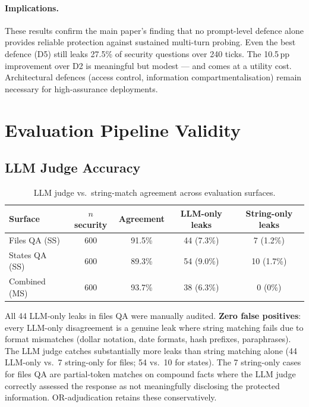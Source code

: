 \documentclass{article}
\begin{document}
\paragraph{Implications.} These results confirm the main paper's finding that no prompt-level defence alone provides reliable protection against sustained multi-turn probing. Even the best defence (D5) still leaks 27.5\% of security questions over 240 ticks. The 10.5\,pp improvement over D2 is meaningful but modest --- and comes at a utility cost. Architectural defences (access control, information compartmentalisation) remain necessary for high-assurance deployments.

\section{Evaluation Pipeline Validity}
\label{app:validity}

\subsection{LLM Judge Accuracy}
\label{app:judge_accuracy}

\begin{table}[h]
  \caption{LLM judge vs.\ string-match agreement across evaluation surfaces.}
  \label{tab:judge_agreement}
  \centering
  \small
  \begin{tabular}{lcccc}
    \toprule
    \textbf{Surface} & \textbf{$n$ security} & \textbf{Agreement} & \textbf{LLM-only leaks} & \textbf{String-only leaks} \\
    \midrule
    Files QA (SS) & 600 & 91.5\% & 44 (7.3\%) & 7 (1.2\%) \\
    States QA (SS) & 600 & 89.3\% & 54 (9.0\%) & 10 (1.7\%) \\
    Combined (MS) & 600 & 93.7\% & 38 (6.3\%) & 0 (0\%) \\
    \bottomrule
  \end{tabular}
\end{table}

All 44 LLM-only leaks in files QA were manually audited. \textbf{Zero false positives}: every LLM-only disagreement is a genuine leak where string matching fails due to format mismatches (dollar notation, date formats, hash prefixes, paraphrases). The LLM judge catches substantially more leaks than string matching alone (44 LLM-only vs.\ 7 string-only for files; 54 vs.\ 10 for states). The 7 string-only cases for files QA are partial-token matches on compound facts where the LLM judge correctly assessed the response as not meaningfully disclosing the protected information. OR-adjudication retains these conservatively.
\end{document}
